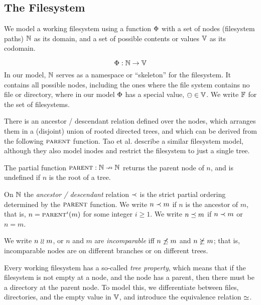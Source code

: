 
\subsection{The Filesystem}

We model a working filesystem
using a function $\Phi$ with a set of nodes (filesystem paths) $\mathbb{N}$ as its domain,
and a set of possible contents or values $\mathbb{V}$ as its codomain.
\begin{mydef}
\[ \Phi: \mathbb{N} \rightarrow \mathbb{V} \]
In our model, $\mathbb{N}$ 
serves as a namespace or ``skeleton'' for the filesystem.
It contains all possible nodes, including the ones 
where the file system contains no file or directory,
where in our model $\Phi$ has a special value, $\ominus\in\mathbb{V}$.
We write $\mathbb{F}$ for the set of filesystems.
\end{mydef}

There is an ancestor / descendant relation defined over the nodes,
which arranges them in a (disjoint) union of rooted directed trees,
and which can be derived from the following $\parent$ function.
Tao et al. \cite{TSR} describe a similar filesystem model, although
they also model inodes and restrict the filesystem to just a single tree.
\begin{mydef}[$\parent$]
The partial function $\text{\normalfont\scshape{parent}}:\mathbb{N}\nrightarrow\mathbb{N}$
returns the parent node of $n$,
and is undefined if $n$ is the root of a tree.
\end{mydef}

\begin{mydef}[$\descendant$, $\descendantEq$]
On $\mathbb{N}$ the \emph{ancestor / descendant} relation $\descendant$ is the
strict partial ordering determined by the $\parent$ function.
We write $n\prec m$ if $n$ is the ancestor of $m$,
that is, $n=\text{\normalfont\scshape{parent}}^i(m)$ for some integer $i\ge 1$.
We write $n\preceq m$ if $n\prec m$ or $n=m$.
\end{mydef}

\begin{mydef}[$n\unrel m$]
We write $n\unrel m$, or $n$ and $m$ are \emph{incomparable}
iff $n\not\preceq m$ and $n\not\succeq m$;
that is, incomparable nodes are on different branches or on different trees.
\end{mydef}

Every working filesystem has a so-called \emph{tree property}, which means that
if the filesystem is not empty at a node, and the node has a parent,
then there must be a directory at the parent node.
To model this, we differentiate between files, directories, and the
empty value in $\mathbb{V}$, and introduce the equivalence relation
$\simeq$.

